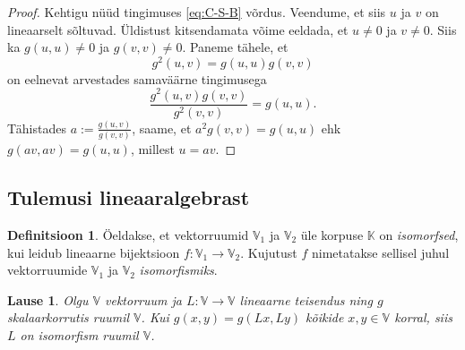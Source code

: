 \documentclass[12pt]{article}
\theoremstyle{plain}
\newtheorem{lause}{Lause}[section]
\theoremstyle{definition}
\newtheorem{definitsioon}{Definitsioon}[section]
\numberwithin{equation}{section}
\def\K{{\mathbb K}}
\def\V{{\mathbb V}}
\begin{document}
\begin{proof}
Kehtigu nüüd tingimuses \ref{eq:C-S-B} võrdus. Veendume, et siis 
$u$ ja $v$ on lineaarselt sõltuvad. Üldistust kitsendamata võime 
eeldada, et $u \neq 0$ ja $v \neq 0$. Siis ka 
$g \left(u,u\right) \neq 0$ ja $g \left(v,v\right) \neq 0$. 
Paneme tähele, et
\[g^2 \left(u, v \right) = g \left(u, u \right) g \left(v, v \right)\]
on eelnevat arvestades samaväärne tingimusega
\[\frac{g^2 \left(u, v \right) g \left(v, v \right)}
{g^2 \left(v, v \right) } = g \left(u, u \right). \]
Tähistades $a := \frac{g \left(u, v \right) }{g \left(v, v \right) }$, 
saame, et $a^2 g \left(v, v \right) = g \left(u, u \right)$ 
ehk $g \left(av, av \right) = g \left(u, u \right)$, millest $u = av$.
\end{proof}

\subsection{Tulemusi lineaaralgebrast} \label{eelteadmised:algebra}

\begin{definitsioon}
Öeldakse, et vektorruumid $\V_1$ ja $\V_2$ üle korpuse $\K$ on 
\emph{isomorfsed}, kui leidub lineaarne bijektsioon 
$f : \V_1 \rightarrow \V_2$. Kujutust $f$ nimetatakse sellisel 
juhul vektorruumide $\V_1$ ja $\V_2$ \emph{isomorfismiks}.
\end{definitsioon}

\begin{lause} \label{lemma:ort-skalaar-on-isomorfism}
Olgu $\V$ vektorruum ja 
$L : \V \rightarrow \V$ lineaarne teisendus ning 
$g$ skalaarkorrutis ruumil $\V$. Kui 
$g \left(x, y\right) = g \left(Lx, Ly\right)$ kõikide 
$x, y \in \V$ korral, siis $L$ on isomorfism ruumil 
$\V$.
\end{lause}
\end{document}
